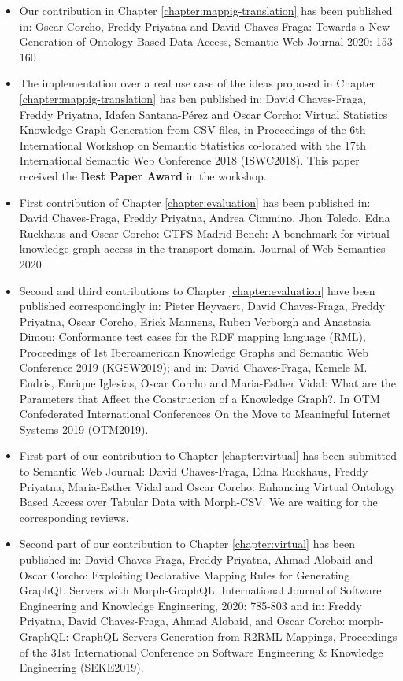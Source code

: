 \begin{itemize}
    \item Our contribution in Chapter \ref{chapter:mappig-translation} has been published in: Oscar Corcho, Freddy Priyatna and David Chaves-Fraga: Towards a New Generation of Ontology Based Data Access, Semantic Web Journal 2020: 153-160
    \item The implementation over a real use case of the ideas proposed in Chapter  \ref{chapter:mappig-translation} has ben published in: David Chaves-Fraga, Freddy Priyatna, Idafen Santana-Pérez and Oscar Corcho: Virtual Statistics Knowledge Graph Generation from CSV files, in Proceedings of the 6th International Workshop on Semantic Statistics co-located with the 17th International Semantic Web Conference 2018 (ISWC2018). This paper received the \textbf{Best Paper Award} in the workshop.
    \item  First contribution of Chapter \ref{chapter:evaluation} has been published in: David Chaves-Fraga, Freddy Priyatna, Andrea Cimmino, Jhon Toledo, Edna Ruckhaus and Oscar Corcho: GTFS-Madrid-Bench: A benchmark for virtual knowledge graph access in the transport domain. Journal of Web Semantics 2020.
    \item Second and third contributions to Chapter \ref{chapter:evaluation} have been  published correspondingly in: Pieter Heyvaert, David Chaves-Fraga, Freddy Priyatna, Oscar Corcho, Erick Mannens, Ruben Verborgh and Anastasia Dimou: Conformance test cases for the RDF mapping language (RML), Proceedings of 1st Iberoamerican Knowledge Graphs and Semantic Web Conference 2019 (KGSW2019); and in: David Chaves-Fraga, Kemele M. Endris, Enrique Iglesias, Oscar Corcho and Maria-Esther Vidal: What are the Parameters that Affect the Construction of a Knowledge Graph?. In OTM Confederated International Conferences On the Move to Meaningful Internet Systems 2019 (OTM2019).
    \item First part of our contribution to Chapter \ref{chapter:virtual} has been submitted to Semantic Web Journal: David Chaves-Fraga, Edna Ruckhaus, Freddy Priyatna, Maria-Esther Vidal and Oscar Corcho: Enhancing Virtual Ontology Based Access over Tabular Data with Morph-CSV. We are waiting for the corresponding reviews.
    \item Second part of our contribution to Chapter \ref{chapter:virtual} has been published in: David Chaves-Fraga, Freddy Priyatna, Ahmad Alobaid and Oscar Corcho: Exploiting Declarative Mapping Rules for Generating GraphQL Servers with Morph-GraphQL. International Journal of Software Engineering and Knowledge Engineering, 2020: 785-803 and in: Freddy Priyatna, David Chaves-Fraga, Ahmad Alobaid, and Oscar Corcho: morph-GraphQL: GraphQL Servers Generation from R2RML Mappings, Proceedings of the 31st International Conference on Software Engineering \& Knowledge Engineering (SEKE2019).

\end{itemize}
